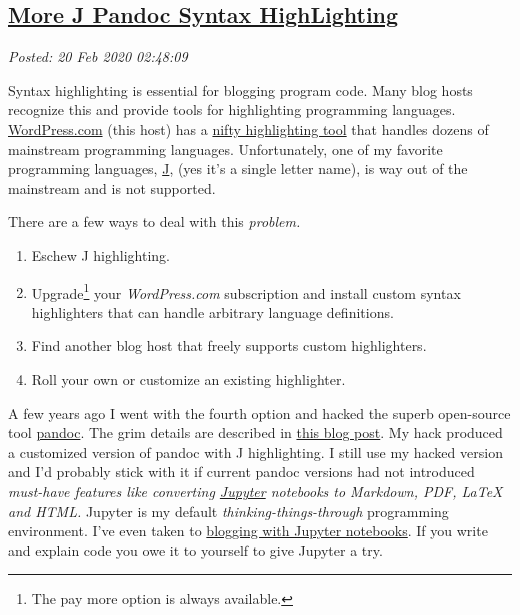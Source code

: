 %

\subsection*{\href{http://analyzethedatanotthedrivel.org/2020/02/19/more-j-pandoc-syntax-highlighting/}{More J Pandoc Syntax HighLighting}}


\noindent\emph{Posted: 20 Feb 2020 02:48:09}
\vspace{6pt}

Syntax highlighting is essential for blogging program code. Many blog
hosts recognize this and provide tools for highlighting programming
languages. \href{https://wordpress.com/}{WordPress.com} (this host) has
a
\href{https://en.support.wordpress.com/wordpress-editor/blocks/syntax-highlighter-code-block/}{nifty
highlighting tool} that handles dozens of mainstream programming
languages. Unfortunately, one of my favorite programming languages,
\href{//www.jsoftware.com}{J}, (yes it's a single letter name), is way
out of the mainstream and is not supported.

There are a few ways to deal with this \emph{problem.}

\begin{enumerate}
\def\labelenumi{\arabic{enumi}.}
\item
  Eschew J highlighting.
\item
  Upgrade\footnote{
  The pay more option is always available.
  } your
  \emph{WordPress.com} subscription and install custom syntax
  highlighters that can handle arbitrary language definitions.
\item
  Find another blog host that freely supports custom highlighters.
\item
  Roll your own or customize an existing highlighter.
\end{enumerate}

A few years ago I went with the fourth option and hacked the superb
open-source tool \href{https://pandoc.org/}{pandoc}. The grim details
are described in
\href{https://analyzethedatanotthedrivel.org/2012/09/20/pandoc-based-j-syntax-highlighting/}{this
blog post}. My hack produced a customized version of pandoc with J
highlighting. I still use my hacked version and I'd probably stick with
it if current pandoc versions had not introduced \emph{must-have
features like converting \href{https://jupyter.org/}{Jupyter} notebooks
to Markdown, PDF, LaTeX and HTML.} Jupyter is my default
\emph{thinking-things-through} programming environment. I've even taken
to
\href{https://github.com/bakerjd99/smugpyter/blob/master/notebooks/Unified\%20XKCD\%20Colors.ipynb}{blogging
with Jupyter notebooks}. If you write and explain code you owe it to
yourself to give Jupyter a try.


